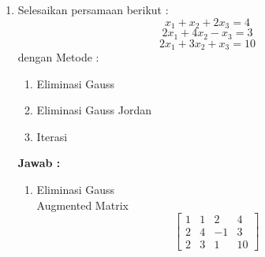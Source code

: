 \documentclass[xcolor=table]{uofa-eng-assignment}
\begin{document}
\maketitle

\begin{enumerate}

    \item Selesaikan persamaan berikut :
          \begin{equation}
              x_1 + x_2 + 2x_3 = 4
          \end{equation}
          \begin{equation}
              2x_1 + 4x_2 - x_3 = 3
          \end{equation}
          \begin{equation}
              2x_1 + 3x_2 + x_3 = 10
          \end{equation}
          dengan Metode :
          \begin{enumerate}
              \item Eliminasi Gauss
              \item Eliminasi Gauss Jordan
              \item Iterasi
          \end{enumerate}
          \textbf{Jawab :}
          \medskip
          \begin{enumerate}
              \item Eliminasi Gauss \\
                    Augmented Matrix
                    \begin{equation}
                        \begin{bmatrix}
                            1 & 1 & 2  & 4  \\
                            2 & 4 & -1 & 3  \\
                            2 & 3 & 1  & 10
                        \end{bmatrix}
                    \end{equation}


\end{enumerate}
\end{enumerate}
\end{document}
